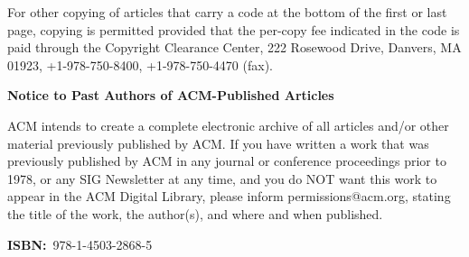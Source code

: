 \documentclass[10pt]{book}
\begin{document}
\vspace{.2cm}

\noindent For other copying of articles that carry a code at the bottom of the first or
last page, copying is permitted provided that the per-copy fee indicated in
the code is paid through the Copyright Clearance Center, 222 Rosewood Drive,
Danvers, MA 01923, +1-978-750-8400, +1-978-750-4470 (fax).

\vspace{.4cm}

\noindent \textbf{Notice to Past Authors of ACM-Published Articles}

\noindent ACM intends to create a complete electronic archive of all articles and/or
other material previously published by ACM. If you have written a work that
was previously published by ACM in any journal or conference proceedings prior
to 1978, or any SIG Newsletter at any time, and you do NOT want this work to
appear in the ACM Digital Library, please inform permissions@acm.org, stating
the title of the work, the author(s), and where and when published.

\vspace{.4cm}

\noindent \large \textbf{ISBN:}~978-1-4503-2868-5
\end{document}
